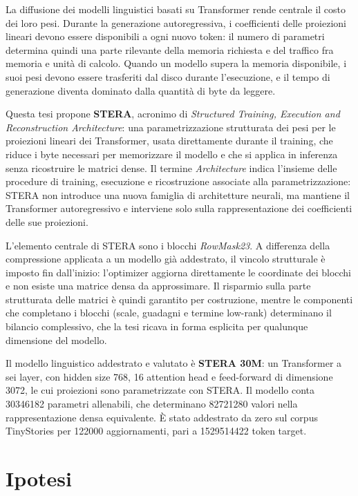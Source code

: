 La diffusione dei modelli linguistici basati su Transformer rende centrale il costo dei loro pesi. Durante la generazione autoregressiva, i coefficienti delle proiezioni lineari devono essere disponibili a ogni nuovo token: il numero di parametri determina quindi una parte rilevante della memoria richiesta e del traffico fra memoria e unità di calcolo. Quando un modello supera la memoria disponibile, i suoi pesi devono essere trasferiti dal disco durante l'esecuzione, e il tempo di generazione diventa dominato dalla quantità di byte da leggere.

Questa tesi propone \textbf{STERA}, acronimo di \emph{Structured Training, Execution and Reconstruction Architecture}: una parametrizzazione strutturata dei pesi per le proiezioni lineari dei Transformer, usata direttamente durante il training, che riduce i byte necessari per memorizzare il modello e che si applica in inferenza senza ricostruire le matrici dense. Il termine \emph{Architecture} indica l'insieme delle procedure di training, esecuzione e ricostruzione associate alla parametrizzazione: STERA non introduce una nuova famiglia di architetture neurali, ma mantiene il Transformer autoregressivo e interviene solo sulla rappresentazione dei coefficienti delle sue proiezioni.

L'elemento centrale di STERA sono i blocchi \emph{RowMask23}. A differenza della compressione applicata a un modello già addestrato, il vincolo strutturale è imposto fin dall'inizio: l'optimizer aggiorna direttamente le coordinate dei blocchi e non esiste una matrice densa da approssimare. Il risparmio sulla parte strutturata delle matrici è quindi garantito per costruzione, mentre le componenti che completano i blocchi (scale, guadagni e termine low-rank) determinano il bilancio complessivo, che la tesi ricava in forma esplicita per qualunque dimensione del modello.

Il modello linguistico addestrato e valutato è \textbf{STERA 30M}: un Transformer a sei layer, con hidden size 768, 16 attention head e feed-forward di dimensione \num{3072}, le cui proiezioni sono parametrizzate con STERA. Il modello conta \num{30346182} parametri allenabili, che determinano \num{82721280} valori nella rappresentazione densa equivalente. È stato addestrato da zero sul corpus TinyStories per \num{122000} aggiornamenti, pari a \num{1529514422} token target.

\section*{Ipotesi}

